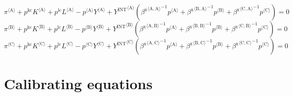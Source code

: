 \begin{equation}
{\pi}^{\langle \mathrm{A}\rangle} + {p^{\mathrm{kc}}} {{K}^{\langle \mathrm{A}\rangle}} + {p^{\mathrm{lc}}} {{L}^{\langle \mathrm{A}\rangle}} - {{p}^{\langle \mathrm{A}\rangle}} {{Y}^{\langle \mathrm{A}\rangle}} + {{Y^{\mathrm{INT}}}^{\langle \mathrm{A}\rangle}} \left({{\beta^{\mathrm{x}}}^{\langle \mathrm{\mathrm{A}},\mathrm{\mathrm{A}}\rangle}}^{-1} {{p}^{\langle \mathrm{A}\rangle}} + {{\beta^{\mathrm{x}}}^{\langle \mathrm{\mathrm{B}},\mathrm{\mathrm{A}}\rangle}}^{-1} {{p}^{\langle \mathrm{B}\rangle}} + {{\beta^{\mathrm{x}}}^{\langle \mathrm{\mathrm{C}},\mathrm{\mathrm{A}}\rangle}}^{-1} {{p}^{\langle \mathrm{C}\rangle}}\right) = 0
\end{equation}
\begin{equation}
{\pi}^{\langle \mathrm{B}\rangle} + {p^{\mathrm{kc}}} {{K}^{\langle \mathrm{B}\rangle}} + {p^{\mathrm{lc}}} {{L}^{\langle \mathrm{B}\rangle}} - {{p}^{\langle \mathrm{B}\rangle}} {{Y}^{\langle \mathrm{B}\rangle}} + {{Y^{\mathrm{INT}}}^{\langle \mathrm{B}\rangle}} \left({{\beta^{\mathrm{x}}}^{\langle \mathrm{\mathrm{A}},\mathrm{\mathrm{B}}\rangle}}^{-1} {{p}^{\langle \mathrm{A}\rangle}} + {{\beta^{\mathrm{x}}}^{\langle \mathrm{\mathrm{B}},\mathrm{\mathrm{B}}\rangle}}^{-1} {{p}^{\langle \mathrm{B}\rangle}} + {{\beta^{\mathrm{x}}}^{\langle \mathrm{\mathrm{C}},\mathrm{\mathrm{B}}\rangle}}^{-1} {{p}^{\langle \mathrm{C}\rangle}}\right) = 0
\end{equation}
\begin{equation}
{\pi}^{\langle \mathrm{C}\rangle} + {p^{\mathrm{kc}}} {{K}^{\langle \mathrm{C}\rangle}} + {p^{\mathrm{lc}}} {{L}^{\langle \mathrm{C}\rangle}} - {{p}^{\langle \mathrm{C}\rangle}} {{Y}^{\langle \mathrm{C}\rangle}} + {{Y^{\mathrm{INT}}}^{\langle \mathrm{C}\rangle}} \left({{\beta^{\mathrm{x}}}^{\langle \mathrm{\mathrm{A}},\mathrm{\mathrm{C}}\rangle}}^{-1} {{p}^{\langle \mathrm{A}\rangle}} + {{\beta^{\mathrm{x}}}^{\langle \mathrm{\mathrm{B}},\mathrm{\mathrm{C}}\rangle}}^{-1} {{p}^{\langle \mathrm{B}\rangle}} + {{\beta^{\mathrm{x}}}^{\langle \mathrm{\mathrm{C}},\mathrm{\mathrm{C}}\rangle}}^{-1} {{p}^{\langle \mathrm{C}\rangle}}\right) = 0
\end{equation}



\section{Calibrating equations}

